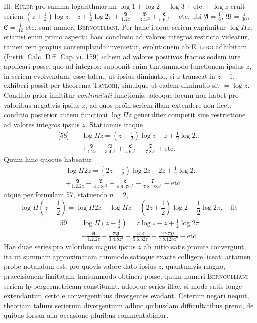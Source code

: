 Ill. \textsc{Euler} pro summa logarithmorum
$\log1+\log2+\log3+\mathrm{etc.}+\log z$ eruit seriem
$(z+\frac12)\log z-z+\frac12\log2\pi
+\frac{\mathfrak A}{1.2z}-\frac{\mathfrak B}{3.4z^3}
+\frac{\mathfrak C}{5.6z^5}-\mathrm{etc.}$
ubi $\mathfrak A=\frac16$, $\mathfrak B=\frac1{30}$,
$\mathfrak C=\frac1{42}$ etc. sunt numeri \textsc{Bernoulliani}.
Per hanc itaque seriem exprimitur $\log\Pi z$; etiamsi enim primo
aspectu haec conclusio ad valores integros restricta videatur,
tamen rem propius contemplando invenietur, evolutionem ab
\textsc{Eulero} adhibitam (Instit. Calc. Diff. Cap.\,\textsc{vi}. 159)
saltem ad valores positivos fractos eodem iure applicari posse,
quo ad integros: supponit enim tantummodo functionem ipsius $z$,
in seriem evolvendam, esse talem, ut ipsius diminutio, si $z$
transeat in $z-1$, exhiberi possit per theorema \textsc{Taylori},
simulque ut eadem diminutio sit $=\log z$. Conditio prior innititur
\emph{continuitati} functionis, adeoque locum non habet pro
valoribus negativis ipsius $z$, ad quos proïn seriem illam
extendere non licet: conditio posterior autem functioni
$\log\Pi z$ generaliter competit sine restrictione ad valores
integros ipsius $z$. Statuamus itaque
\[
\begin{aligned}
{}\text{[58]}\quad &\log\Pi z=(z+\frac12)\log z-z+\frac12\log2\pi\\[4pt]
&+\frac{\mathfrak A}{1.2z}-\frac{\mathfrak B}{3.4z^3}
+\frac{\mathfrak C}{5.6z^5}-\frac{\mathfrak D}{7.8z^7}
+\mathrm{etc.}
\end{aligned}
\]
Quum hinc quoque habeatur
\[
\begin{aligned}
&\log\Pi2z=(2z+\frac12)\log2z-2z+\frac12\log2\pi\\[4pt]
&+\frac{\mathfrak A}{1.2.2z}-\frac{\mathfrak B}{3.4.8z^3}
+\frac{\mathfrak C}{5.6.32z^5}-\frac{\mathfrak D}{7.8.128z^7}
+\mathrm{etc.}
\end{aligned}
\]
atque per formulam 57, statuendo $n=2$,
\[
\log\Pi(z-\frac12)=\log\Pi2z-\log\Pi z
-(2z+\frac12)\log2+\frac12\log2\pi,\quad\text{fit}
\]
\[
\begin{aligned}
{}\text{[59]}\quad &\log\Pi(z-\frac12)=z\log z-z+\frac12\log2\pi\\[4pt]
&-\frac{\mathfrak A}{1.2.2z}+\frac{7\mathfrak B}{3.4.8z^3}
-\frac{31\mathfrak C}{5.6.32z^5}+\frac{127\mathfrak D}{7.8.128z^7}
-\mathrm{etc.}
\end{aligned}
\]
Hae duae series pro valoribus magnis ipsius $z$ ab initio satis
promte convergunt, ita ut summam approximatam commode satisque
exacte colligere liceat: attamen probe notandum est, pro quovis
valore dato ipsius $z$, quantumvis magno, praecisionem limitatam
tantummodo obtineri posse, quum numeri \textsc{Bernoulliani}
seriem hypergeometricam constituant, adeoque series illae, si modo
satis longe extendantur, certo e convergentibus divergentes evadant.
Ceterum negari nequit, theoriam talium serierum divergentium adhuc
quibusdam difficultatibus premi, de quibus forsan alia occasione
pluribus commentabimur.
